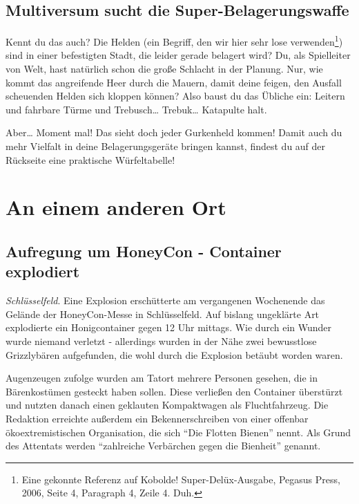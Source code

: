 \documentclass[final]{multiversum}
\begin{document}
\makemultititle
%


\subsection{Multiversum sucht die Super-Belagerungswaffe}
Kennt du das auch? 
Die Helden (ein Begriff, den wir hier sehr lose verwenden\footnote{Eine gekonnte Referenz auf Kobolde! Super-Delüx-Ausgabe, Pegasus Press, 2006, Seite 4, Paragraph 4, Zeile 4. Duh.})
 sind in einer befestigten Stadt, die leider gerade belagert wird?
Du, als Spielleiter von Welt, hast natürlich schon die große Schlacht in der Planung.
Nur, wie kommt das angreifende Heer durch die Mauern, damit deine feigen, den Ausfall scheuenden Helden sich kloppen können?
Also baust du das Übliche ein: Leitern und fahrbare Türme und Trebusch\dots{} Trebuk\dots{} Katapulte halt.

Aber\dots{} Moment mal! Das sieht doch jeder Gurkenheld kommen!
Damit auch du mehr Vielfalt in deine Belagerungsgeräte bringen kannst, findest du auf der Rückseite eine praktische Würfeltabelle!

\section{An einem anderen Ort}

\subsection{Aufregung um HoneyCon - Container explodiert}
\textit{Schlüsselfeld}. Eine Explosion erschütterte am vergangenen Wochenende das Gelände der HoneyCon-Messe in Schlüsselfeld. 
Auf bislang ungeklärte Art explodierte ein Honigcontainer gegen 12 Uhr mittags. 
Wie durch ein Wunder wurde niemand verletzt - allerdings wurden in der Nähe zwei bewusstlose Grizzlybären aufgefunden, die wohl durch die Explosion betäubt worden waren.

Augenzeugen zufolge wurden am Tatort mehrere Personen gesehen, die in Bärenkostümen gesteckt haben sollen. 
Diese verließen den Container überstürzt und nutzten danach einen geklauten Kompaktwagen als Fluchtfahrzeug. 
Die Redaktion erreichte außerdem ein Bekennerschreiben von einer offenbar ökoextremistischen Organisation, die sich \enquote{Die Flotten Bienen} nennt. 
Als Grund des Attentats werden \enquote{zahlreiche Verbärchen gegen die Bienheit} genannt.
\end{document}
